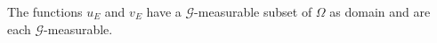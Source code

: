 The functions $u_E$ and $v_E$ have a $\mathcal{G}$-measurable subset of $\Omega$ as domain and are each $\mathcal{G}$-measurable.

